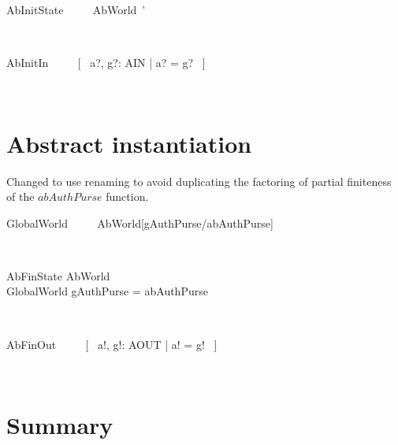 \begin{LSDef}
\begin{zed}
  AbInitState ~~~~ AbWorld~'
\end{zed}~\end{LSDef}

\begin{LSDef}
\begin{zed}
  AbInitIn ~~~~ [~ a?, g?: AIN | a? = g? ~]
\end{zed}~\end{LSDef}

\section{Abstract instantiation}

Changed to use renaming to avoid duplicating the
factoring of partial finiteness of the $abAuthPurse$
function.
%
\begin{LSDef}
\begin{zed}
   GlobalWorld ~~~~ AbWorld[gAuthPurse/abAuthPurse]
\end{zed}~\end{LSDef}

\begin{LSDef}
\begin{schema}{AbFinState}
   AbWorld \\
   GlobalWorld
\where
   gAuthPurse = abAuthPurse
\end{schema}~\end{LSDef}

\begin{LSDef}
\begin{zed}
   AbFinOut ~~~~ [~ a!, g!: AOUT | a! = g! ~]
\end{zed}~\end{LSDef}


\section{Summary}\label{ch3.summary}

